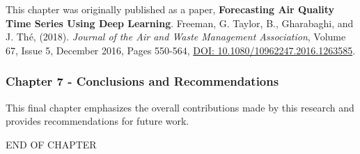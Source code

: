 This chapter was originally published as a paper, \textbf{Forecasting Air Quality Time Series Using Deep Learning}. Freeman, G. Taylor, B., Gharabaghi, and J.  Th\'e, (2018).  \textit{Journal of the Air and Waste Management Association}, Volume 67, Issue 5, December 2016, Pages 550-564, \url{DOI: 10.1080/10962247.2016.1263585}.

\subsubsection*{Chapter 7 - Conclusions and Recommendations }

This final chapter emphasizes the overall contributions made by this research and provides recommendations for future work. 


\bigskip
\begin{center}
END OF CHAPTER
\end{center}